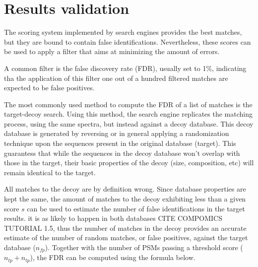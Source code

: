 \documentclass[11pt, a4paper]{report}
\begin{document}
%

\section{Results validation}
\label{sec:validation}

The scoring system implemented by search engines provides the best matches, but they are bound to contain false identifications. Nevertheless, these scores can be used to apply a filter that aims at minimizing the amount of errors.

A common filter is the false discovery rate (FDR), usually set to 1\%, indicating tha the application of this filter one out of a hundred filtered matches are expected to be false positives.

The most commonly used method to compute the FDR of a list of matches is the target-decoy search. Using this method, the search engine replicates the matching process, using the same spectra, but instead against a decoy database. This decoy database is generated by reversing or in general applying a randomization technique upon the sequences present in the original database (target). This guarantess that while the sequences in the decoy database won't overlap with those in the target, their basic properties of the decoy (size, composition, etc) will remain identical to the target.

All matches to the decoy are by definition wrong. Since database properties 
are kept the same, the amount of matches to the decoy exhibiting less than a given score $s$ can be used to estimate the number of false identifications in the  target results. it is as likely to happen in both databases CITE COMPOMICS TUTORIAL 1.5, thus the number of matches in the decoy provides an accurate estimate of the number of random matches, or false positives, against the target database ($n_{fp}$). Together with the number of PSMs passing a threshold score ($n_{tp} + n_{tp}$), the FDR can be computed using the formula below.
\end{document}

